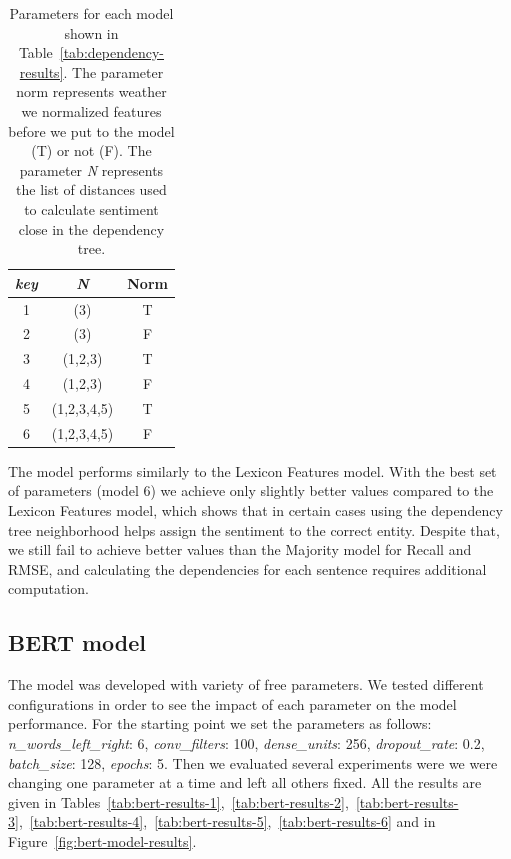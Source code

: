 \documentclass[11pt,a4paper]{article}
\begin{document}
\begin{table}[h]
\centering
\begin{tabular}{ccc}
\emph{key} & \emph{N} & Norm \\ \hline
1 & (3) & T  \\
2 & (3) & F  \\
3 & (1,2,3) & T  \\
4 & (1,2,3) & F  \\
5 & (1,2,3,4,5) & T  \\
6 & (1,2,3,4,5) & F  \\
\end{tabular}
\caption{Parameters for each model shown in Table~\ref{tab:dependency-results}.
        The parameter norm represents weather we normalized features before we put to the model (T) or not (F). The parameter \emph{N} represents the list of distances used to calculate sentiment close in the dependency tree. }
\label{tab:dependency-parameters}
\end{table}

The model performs similarly to the Lexicon Features model. With the best set of parameters (model 6) we achieve only slightly better values compared to the Lexicon Features model, which shows that in certain cases using the dependency tree neighborhood helps assign the sentiment to the correct entity.
Despite that, we still fail to achieve better values than the Majority model for Recall and RMSE, and calculating the dependencies for each sentence requires additional computation.

\subsection{BERT model}

The model was developed with variety of free parameters.
We tested different configurations in order to see the impact of each parameter on the model performance.
For the starting point we set the parameters as follows: \textit{n\_words\_left\_right}: 6, \textit{conv\_filters}: 100, \textit{dense\_units}: 256, \textit{dropout\_rate}: 0.2, \textit{batch\_size}: 128, \textit{epochs}: 5.
Then we evaluated several experiments were we were changing one parameter at a time and left all others fixed.
All the results are given in Tables~\ref{tab:bert-results-1},~\ref{tab:bert-results-2},~\ref{tab:bert-results-3},~\ref{tab:bert-results-4},~\ref{tab:bert-results-5},~\ref{tab:bert-results-6} and in Figure~\ref{fig:bert-model-results}.
\end{document}

